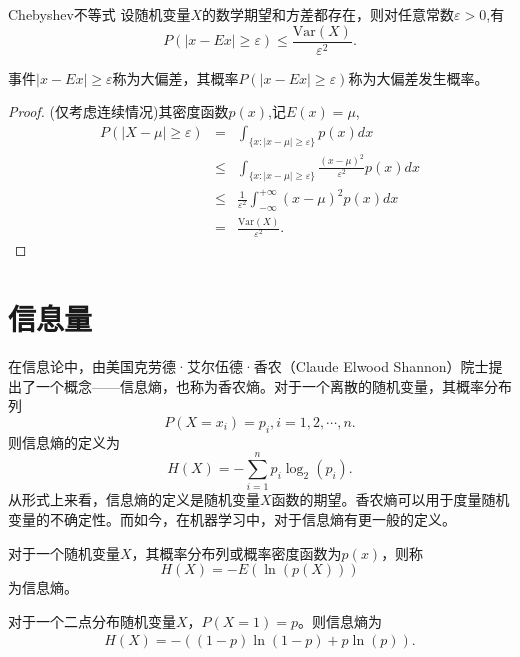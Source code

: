 \begin{theorem}{Chebyshev不等式}\label{thm:chap06_Chebyshev_Inequality}
    设随机变量$X$的数学期望和方差都存在，则对任意常数$\varepsilon >0$,有
	$$P(|x-E x| \geqslant \varepsilon) \leq \frac{\text{Var}(X)}{\varepsilon^{2}}.$$
\end{theorem}
\begin{remark}
事件${|x-E x| \geqslant \varepsilon}$称为大偏差，其概率$P(|x-E x| \geqslant \varepsilon)$称为大偏差发生概率。
\end{remark}
\begin{proof}
    (仅考虑连续情况)其密度函数$p(x)$,记$E(x)=\mu$,
	\begin{eqnarray*}
	    P(|X-\mu| \geqslant \varepsilon) &=&\int_{\{x:|x-\mu| \geqslant \varepsilon\}} p(x) d x \\
& \leqslant &\int_{\{x:|x-\mu| \geqslant \varepsilon\}} \frac{(x-\mu)^{2}}{\varepsilon^{2}} p(x) d x \\
& \leqslant& \frac{1}{\varepsilon^{2}} \int_{-\infty}^{+\infty}(x-\mu)^{2} p(x) d x \\
&=&\frac{\text{Var}(X)}{\varepsilon^{2}}.
	\end{eqnarray*}
\end{proof}

\section{信息量}
在信息论中，由美国克劳德·艾尔伍德·香农（Claude Elwood Shannon）院士提出了一个概念——信息熵，也称为香农熵。对于一个离散的随机变量，其概率分布列
$$
P(X=x_i) = p_i,i=1,2,\cdots,n.
$$
则信息熵的定义为
$$
H(X) = -\sum_{i=1}^n p_i \log_2(p_i).
$$
从形式上来看，信息熵的定义是随机变量$X$函数的期望。香农熵可以用于度量随机变量的不确定性。而如今，在机器学习中，对于信息熵有更一般的定义。
\begin{definition}[（信息熵）]
    对于一个随机变量$X$，其概率分布列或概率密度函数为$p(x)$，则称
    $$
    H(X) = - E(\ln(p(X)))
    $$
    为信息熵。
\end{definition}

\begin{example}
    对于一个二点分布随机变量$X$，$P(X=1)=p$。则信息熵为
    \begin{eqnarray*}
        H(X) = - ((1-p) \ln(1-p) + p \ln(p)).
    \end{eqnarray*}
\end{example}

